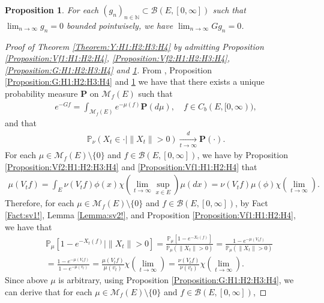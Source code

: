 \documentclass[12pt,a4paper]{amsart}
\numberwithin{equation}{section}
\theoremstyle{plain}
\newtheorem{prop}[thm]{Proposition}
\theoremstyle{definition}
\theoremstyle{remark}
\begin{document}
\begin{prop} \label{Proposition:GD:H1:H2:H3:H4} 
For each $(g_n)_{n\in \mathbb N} \subset \mathcal B(E,[0,\infty])$ such that $\lim_{n\to \infty} g_n = 0$ bounded pointwisely, we have $\lim_{n\to \infty} G g_n = 0$.
\end{prop}
\begin{proof}[ Proof of Theorem \ref{Theorem:Y:H1:H2:H3:H4} by admitting Proposition \ref{Proposition:Vf1:H1:H2:H4}, \ref{Proposition:Vf2:H1:H2:H3:H4}, \ref{Proposition:G:H1:H2:H3:H4} and \ref{Proposition:GD:H1:H2:H3:H4}]
From \cite[Proposition 1.19]{Li2011MeasureValued}, Proposition \ref{Proposition:G:H1:H2:H3:H4} and \ref{Proposition:GD:H1:H2:H3:H4}  we have that there exists a unique probability measure $\mathbf P$ on $\mathcal M_f(E)$ such that 
\begin{align}
 e^{-Gf} 
 = \int_{\mathcal M_f(E)} e^{- \mu(f)} \mathbf P(d\mu), 
 \quad f\in C_b (E, [0,\infty)),
\end{align}
and that
\begin{align}
 \mathbb P_{\nu}(X_t \in \cdot | \|X_t\|>0 ) 
 \xrightarrow[t\to \infty]{d} \mathbf P(\cdot).
 \end{align}
For each $\mu \in \mathcal M_f(E)\setminus \{0\}$ and $f \in \mathcal B(E,[0,\infty])$, we have by Proposition \ref{Proposition:Vf2:H1:H2:H3:H4} and \ref{Proposition:Vf1:H1:H2:H4} that
\begin{align}
\mu(V_tf)
 = \int_E \nu(V_tf) \phi(x) \chi(\lim_{t\to \infty}\sup_{x\in E}) \mu(dx) 
 = \nu(V_tf) \mu(\phi)\chi(\lim_{t\to \infty}).
\end{align}  
Therefore, for each $\mu \in \mathcal M_f(E)\setminus\{0\}$ and $f\in \mathcal B(E,[0,\infty])$, by Fact \ref{Fact:sv1!}, Lemma \ref{Lemma:sv2!}, and Proposition \ref{Proposition:Vf1:H1:H2:H4}, we have that
\begin{align}
 &\mathbb P_\mu [1 - e^{-X_t(f)}|\|X_t\|>0]
 = \frac{\mathbb P_\mu [ 1 - e^{- X_t(f)}]} {\mathbb P_\mu (\|X_t\| > 0) }
 = \frac{1 - e^{- \mu(V_tf)}} { \mathbb P_\mu(\|X_t\| > 0)} 
 \\&= \frac{1 - e^{- \mu(V_tf)}} {1 - e^{-\mu(v_t)}}
 = \frac{ \mu(V_t f) }{ \mu(v_t) }  \chi(\lim_{t\to \infty})
 = \frac{ \nu(V_tf) }{ \nu(v_t) } \chi(\lim_{t\to \infty}).
 \end{align}
Since above $\mu$ is arbitrary, using Proposition \ref{Proposition:G:H1:H2:H3:H4}, we can derive that for each $\mu \in \mathcal M_f(E)\setminus\{0\}$ and $f\in \mathcal B(E,[0,\infty])$,

\end{proof}
\end{document}
